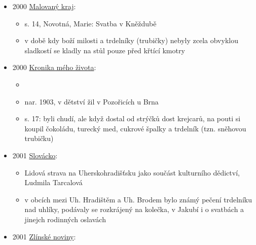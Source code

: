 \begin{itemize}
  \begin{itemize}
  \tightlist
  \item
    Jančář, Josef
  \item
    s. 60: jídlo pro šestinedělku: vařená slepice, velké i malé vdolky,
    trdelníky, boží milosti a jako pochoutka rohlíky z pekárny.
  \end{itemize}
\item
  2000
  \href{https://ndk.cz/uuid/uuid:6f3fab20-efa6-11e3-a2c6-005056827e51}{Malovaný
  kraj}:

  \begin{itemize}
  \tightlist
  \item
    s. 14, Novotná, Marie: Svatba v Kněždubě
  \item
    v době kdy boží milosti a trdelníky (trubičky) nebyly zcela obvyklou
    sladkostí se kladly na stůl pouze před křtící kmotry
  \end{itemize}
\item
  2000
  \href{https://ndk.cz/uuid/uuid:da800303-4eb7-11f1-891f-da4735a33465}{Kronika
  mého života}:

  \begin{itemize}
  \tightlist
  \item
  \item
    nar. 1903, v dětství žil v Pozořicích u Brna
  \item
    s. 17: byli chudí, ale když dostal od strýčků dost krejcarů, na
    pouti si koupil čokoládu, turecký med, cukrové špalky a trdelník
    (tzn. sněhovou trubičku)
  \end{itemize}
\item
  2001
  \href{https://ceskadigitalniknihovna.cz/view/uuid:a9321c14-1021-43dc-8103-3032373856fa?page=uuid\%3A85bc7b46-bf59-11ed-9fa2-001b63bd97ba&source=kfbz}{Slovácko}:

  \begin{itemize}
  \tightlist
  \item
    Lidová strava na Uherskohradišťsku jako součást kulturního dědictví,
    Ludmila Tarcalová
  \item
    v obcích mezi Uh. Hradištěm a Uh. Brodem bylo známý pečení trdelníku
    nad uhlíky, podávaly se rozkrájený na kolečka, v Jakubí i o svatbách
    a jinejch rodinných oslavách
  \end{itemize}
\item
  2001
  \href{https://ceskadigitalniknihovna.cz/view/uuid:322e701c-2381-435e-a7c8-e76568ab8a64?page=uuid:edf52cea-b1b8-11ed-8d8c-001b63bd97ba&fulltext=trdeln\%C3\%ADk\%20OR\%20trdeln\%C3\%ADky\%20OR\%20trdeln\%C3\%ADku\%20&source=kfbz}{Zlínské
  noviny}:


\end{itemize}
